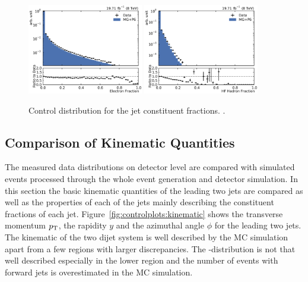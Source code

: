 \begin{figure}[htbp]
    \includegraphics[width=0.45\textwidth]{figures/measurement/jetprop_ef_default.pdf}\hfill
    \includegraphics[width=0.45\textwidth]{figures/measurement/jetprop_hf_emf_default.pdf}
    \caption{Control distribution for the jet constituent fractions. .}
    \label{fig:controlplots:properties}
\end{figure}

\subsection{Comparison of Kinematic Quantities}

The measured data distributions on detector level are compared with simulated events
processed through the whole event generation and detector simulation. In this section
the basic kinematic quantities of the leading two jets are compared as well as the properties
of each of the jets mainly describing the constituent fractions of each jet. Figure~\ref{fig:controlplots:kinematic}
shows the transverse momentum $p_{\mathrm{T}}$, the rapidity $y$ and the azimuthal angle $\phi$ for the leading
two jets. The kinematic of the two dijet system is well described by the MC simulation apart from
a few regions with larger discrepancies. The \pt-distribution is not that well described especially in
the lower \pt region and the number of events with forward jets is overestimated in the MC simulation.

